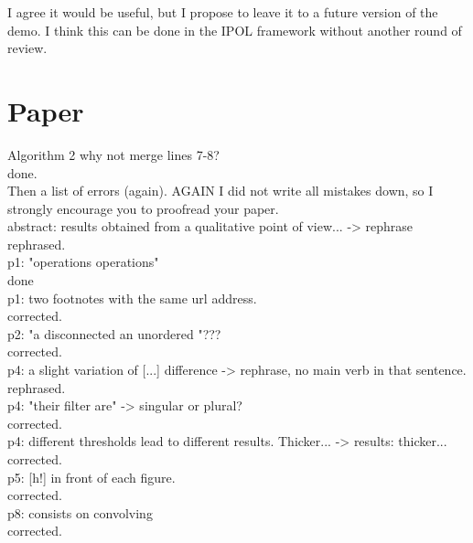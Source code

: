 \documentclass[a4paper,10pt]{report}
\begin{document}
\ans I agree it would be useful, but I propose to leave it to a future version of the demo. I think this can be done in the IPOL framework without another round of review.\\

\section{Paper}

\que Algorithm 2 why not merge lines 7-8?\\

\ans done.\\

Then a list of errors (again). AGAIN I did not write all mistakes down, so I
strongly encourage you to proofread your paper.\\

\que abstract: results obtained from a qualitative point of view... -> rephrase\\
\ans rephrased.\\

\que p1: "operations operations"\\
\ans done\\

\que p1: two footnotes with the same url address.\\
\ans corrected.\\

\que p2: "a disconnected an unordered "???\\
\ans corrected.\\

\que p4:  a slight variation of [...] difference -> rephrase, no main verb in
that sentence.\\
\ans rephrased.\\

\que p4: "their filter are" -> singular or plural?\\
\ans corrected.\\

\que p4: different thresholds lead to different results. Thicker... -> results:
thicker...\\
\ans corrected.\\

\que p5: [h!] in front of each figure.\\
\ans corrected.\\

\que p8: consists on convolving\\
\ans corrected.\\
\end{document}

